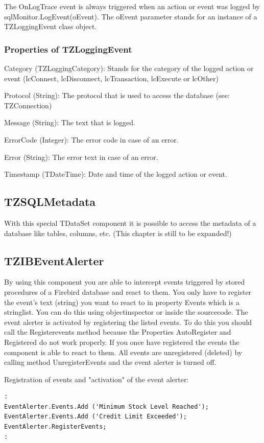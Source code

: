 \documentclass[a4paper,12pt,oneside]{book}
\begin{document}
The OnLogTrace event is always triggered when an action or event was logged by sqlMonitor.LogEvent(oEvent).
The oEvent parameter stands for an instance of a TZLoggingEvent class object.

\subsubsection{Properties of TZLoggingEvent}
Category (TZLoggingCategory): Stands for the category of the logged action or event (lcConnect,
lcDisconnect, lcTransaction, lcExecute or lcOther)

Protocol (String): The protocol that is used to access the database (see: TZConnection)

Message (String): The text that is logged.

ErrorCode (Integer): The error code in case of an error.

Error (String): The error text in case of an error.

Timestamp (TDateTime): Date and time of the logged action or event.

\subsection{TZSQLMetadata}
With this special TDataSet component it is possible to access the metadata of a database like tables, columns, etc.
(This chapter is still to be expanded!)

\subsection{TZIBEventAlerter}
By using this component you are able to intercept events triggered by stored procedures of a Firebird
database and react to them.
You only have to register the event's text (string) you want to react to in property Events which is a stringlist.
You can do this using objectinspector or inside the sourcecode.
The event alerter is activated by registering the listed events.
To do this you should call the Registerevents method because the Properties AutoRegister and Registered do not work properly.
If you once have registered the events the component is able to react to them.
All events are unregistered (deleted) by calling method UnregisterEvents and the event alerter is turned off.

Registration of events and "activation" of the event alerter:

\begin{verbatim}
:
EventAlerter.Events.Add ('Minimum Stock Level Reached');
EventAlerter.Events.Add ('Credit Limit Exceeded');
EventAlerter.RegisterEvents;
:
\end{verbatim}
\end{document}
